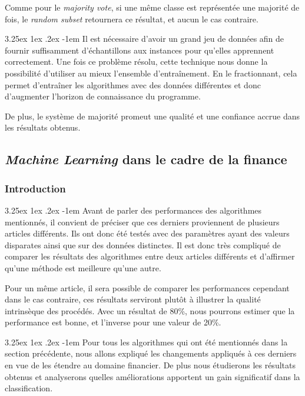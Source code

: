 \documentclass[a4paper, 11pt]{article}
\makeatletter
\renewcommand\paragraph{\@startsection{paragraph}{5}{\z@}%
  {3.25ex \@plus1ex \@minus.2ex}%
  {-1em}%
  {\normalfont\normalsize\bfseries}}
\makeatother
\begin{document}
Comme pour le \textit{majority vote}, si une même classe est représentée une majorité de fois, le \textit{random subset} retournera ce résultat, et aucun le cas contraire.

\paragraph{}
Il est nécessaire d'avoir un grand jeu de données afin de fournir suffisamment d'échantillons aux instances pour qu'elles
apprennent correctement.
Une fois ce problème résolu, cette technique nous donne la possibilité d'utiliser au mieux l'ensemble d'entraînement.
En le fractionnant, cela permet d'entraîner les algorithmes avec des données différentes et donc d'augmenter
l'horizon de connaissance du programme.

De plus, le système de majorité promeut une qualité et une confiance accrue dans les résultats obtenus.


\subsection{\textit{Machine Learning} dans le cadre de la finance}\label{section machine learning finance}
\subsubsection{Introduction}
\paragraph{}
Avant de parler des performances des algorithmes mentionnés, il convient de préciser que ces derniers proviennent
de plusieurs articles différents. Ils ont donc été testés avec des paramètres ayant des valeurs disparates ainsi
que sur des données distinctes.
Il est donc très compliqué de comparer les résultats des algorithmes entre deux articles différents et
d'affirmer qu'une méthode est meilleure qu'une autre. 

Pour un même article, il sera possible de comparer les performances  cependant dans le cas contraire, ces
résultats serviront plutôt à illustrer la qualité intrinsèque des procédés. Avec un résultat de 80\%,
nous pourrons estimer que la performance est bonne, et l'inverse pour une valeur de 20\%.

\paragraph{}
Pour tous les algorithmes qui ont été mentionnés dans la section précédente, nous allons expliqué les changements
appliqués à ces derniers en vue de les étendre au domaine financier. De plus nous étudierons les résultats obtenus
et analyserons quelles améliorations apportent un gain significatif dans la classification.
\end{document}
